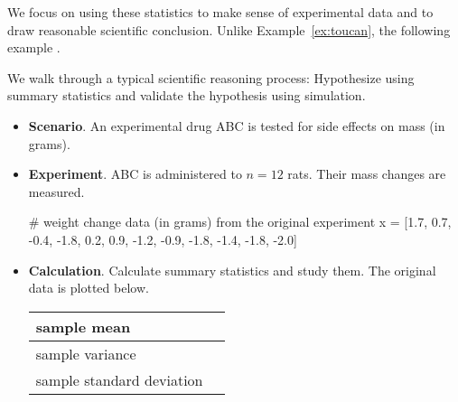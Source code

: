 \documentclass[../main.tex]{subfiles}
\begin{document}
\clearpage
We focus on using these statistics to make sense of experimental data and to draw reasonable scientific conclusion. Unlike Example~\ref{ex:toucan}, the following example .

\begin{example} \label{ex:simulation}
  We walk through a typical scientific reasoning process: Hypothesize using summary statistics and validate the hypothesis using simulation. 

  \begin{itemize}[wide]
    \item \textbf{Scenario}. An experimental drug ABC is tested for side effects on  mass (in grams).

    \item \textbf{Experiment}. ABC is administered to \(n = 12\) rats. Their  mass changes are measured.

      \begin{pythoncode}
# weight change data (in grams) from the original experiment
x = [1.7, 0.7, -0.4, -1.8, 0.2, 0.9, -1.2, -0.9, -1.8, -1.4, -1.8, -2.0]
      \end{pythoncode}

    \item \textbf{Calculation}. Calculate summary statistics and study them. The original data is plotted below.

      \begin{tabular}{l|p{1in}}
        \toprule
        sample mean & \\[2ex]\midrule
        sample variance & \\[2ex]\midrule
        sample standard deviation & \\[2ex]
        \bottomrule
      \end{tabular}

      \begin{center}
      \end{center}


\end{itemize}
\end{example}
\end{document}
